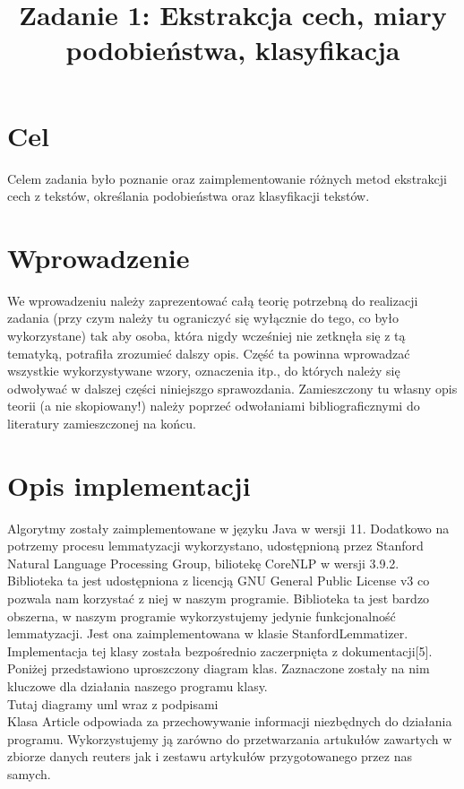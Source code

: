 \documentclass{classrep}
\author{
  \studentinfo{Stanisław Zakrzewski}{210360} \and
  \studentinfo{ Maciej Socha}{210321}
}
\title{Zadanie 1: Ekstrakcja cech, miary podobieństwa, klasyfikacja}
\begin{document}
\maketitle

\section{Cel}
Celem zadania było poznanie oraz zaimplementowanie różnych metod ekstrakcji cech z tekstów, określania podobieństwa oraz klasyfikacji tekstów.

\section{Wprowadzenie}
{\color{blue}
We wprowadzeniu należy zaprezentować całą teorię potrzebną do realizacji
zadania (przy czym należy tu ograniczyć się wyłącznie do tego, co było
wykorzystane) tak aby osoba, która nigdy wcześniej nie zetknęła się z tą
tematyką, potrafiła zrozumieć dalszy opis. Część ta powinna wprowadzać
wszystkie wykorzystywane wzory, oznaczenia itp., do których należy się
odwoływać w dalszej części niniejszgo sprawozdania. Zamieszczony tu własny
opis teorii (a nie skopiowany!) należy poprzeć odwołaniami bibliograficznymi
do literatury zamieszczonej na końcu. }

\section{Opis implementacji}
Algorytmy zostały zaimplementowane w języku Java w wersji 11. Dodatkowo na potrzemy procesu lemmatyzacji wykorzystano, udostępnioną przez Stanford Natural Language Processing Group, biliotekę CoreNLP w wersji 3.9.2. Biblioteka ta jest udostępniona z licencją GNU General Public License v3 co pozwala nam korzystać z niej w naszym programie. Biblioteka ta jest bardzo obszerna, w naszym programie wykorzystujemy jedynie funkcjonalność lemmatyzacji. Jest ona zaimplementowana w klasie StanfordLemmatizer. Implementacja tej klasy została bezpośrednio zaczerpnięta z dokumentacji[5]. Poniżej przedstawiono uproszczony diagram klas. Zaznaczone zostały na nim kluczowe dla działania naszego programu klasy.\\
{\color{red}
Tutaj diagramy uml wraz z podpisami\\}
Klasa Article odpowiada za przechowywanie informacji niezbędnych do działania programu. Wykorzystujemy ją zarówno do przetwarzania artukułów zawartych w zbiorze danych reuters jak i zestawu artykułów przygotowanego przez nas samych.\\
\end{document}
